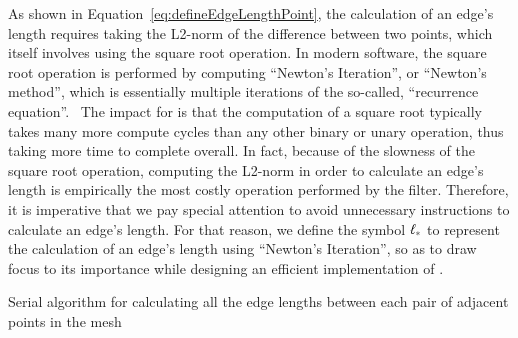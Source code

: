 As shown in Equation~\ref{eq:defineEdgeLengthPoint}, the calculation of an edge's length requires taking the L2-norm of the difference between two points, which itself involves using the square root operation. In modern software, the square root operation is performed by computing ``Newton's Iteration'', or ``Newton's method'', which is essentially multiple iterations of the so-called, ``recurrence equation''.~\cite{Weisstein19b} The impact for  is that the computation of a square root typically takes many more compute cycles than  any other binary or unary operation, thus taking more time to complete overall. In fact, because of the slowness of the square root operation, computing the L2-norm in order to calculate an edge's length is empirically the most costly operation performed by the filter. Therefore, it is imperative that we pay special attention to avoid unnecessary instructions to calculate an edge's length. For that reason, we define the symbol $\ell_\ast$ to represent the calculation of an edge's length using ``Newton's Iteration'', so as to draw focus to its importance while designing an efficient implementation of .%

\begin{algorithm}[ht]
	\DontPrintSemicolon


	\bigskip
	\caption{Serial algorithm for calculating all the edge lengths between each pair of adjacent points in the mesh\label{alg:serialCalculateEdgeLengths}}
\end{algorithm}

